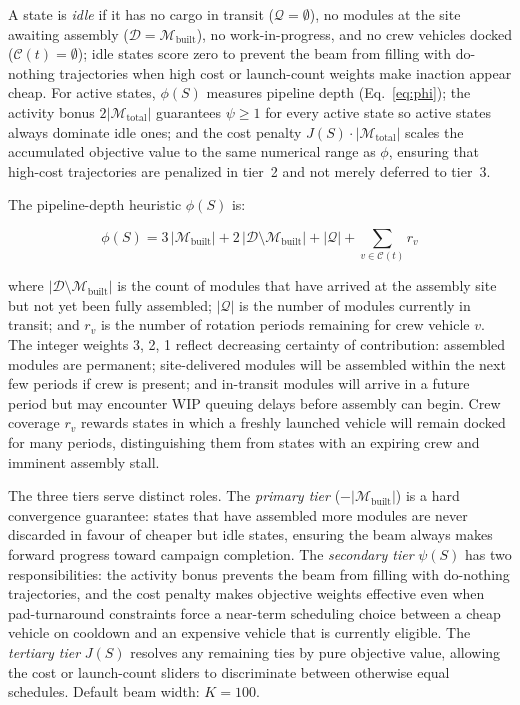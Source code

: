 \noindent A state is \emph{idle} if it has no cargo in transit
($\mathcal{Q} = \emptyset$), no modules at the site awaiting
assembly ($\mathcal{D} = \mathcal{M}_{\mathrm{built}}$), no
work-in-progress, and no crew vehicles docked
($\mathcal{C}(t) = \emptyset$); idle states score zero to prevent
the beam from filling with do-nothing trajectories when high cost
or launch-count weights make inaction appear cheap.
For active states, $\phi(S)$ measures pipeline depth
(Eq.~\ref{eq:phi}); the activity bonus
$2|\mathcal{M}_{\mathrm{total}}|$ guarantees $\psi \geq 1$ for
every active state so active states always dominate idle ones;
and the cost penalty $J(S) \cdot |\mathcal{M}_{\mathrm{total}}|$
scales the accumulated objective value to the same numerical range
as $\phi$, ensuring that high-cost trajectories are penalized in
tier~2 and not merely deferred to tier~3.

The pipeline-depth heuristic $\phi(S)$ is:

\begin{equation}
  \phi(S) = 3\,|\mathcal{M}_{\mathrm{built}}|
          + 2\,|\mathcal{D} \setminus \mathcal{M}_{\mathrm{built}}|
          + |\mathcal{Q}|
          + \sum_{v \in \mathcal{C}(t)} r_v
  \label{eq:phi}
\end{equation}

\noindent where $|\mathcal{D} \setminus \mathcal{M}_{\mathrm{built}}|$
is the count of modules that have arrived at the assembly site but
not yet been fully assembled; $|\mathcal{Q}|$ is the number of
modules currently in transit; and $r_v$ is the number of rotation
periods remaining for crew vehicle $v$.
The integer weights 3, 2, 1 reflect decreasing certainty of
contribution: assembled modules are permanent; site-delivered
modules will be assembled within the next few periods if crew is
present; and in-transit modules will arrive in a future period
but may encounter WIP queuing delays before assembly can begin.
Crew coverage $r_v$ rewards states in which a freshly launched
vehicle will remain docked for many periods, distinguishing them
from states with an expiring crew and imminent assembly stall.

The three tiers serve distinct roles.
The \emph{primary tier} ($-|\mathcal{M}_{\mathrm{built}}|$) is a
hard convergence guarantee: states that have assembled more modules
are never discarded in favour of cheaper but idle states,
ensuring the beam always makes forward progress toward campaign
completion.
The \emph{secondary tier} $\psi(S)$ has two responsibilities:
the activity bonus prevents the beam from filling with do-nothing
trajectories, and the cost penalty makes objective weights
effective even when pad-turnaround constraints force a near-term
scheduling choice between a cheap vehicle on cooldown and an
expensive vehicle that is currently eligible.
The \emph{tertiary tier} $J(S)$ resolves any remaining ties by
pure objective value, allowing the cost or launch-count sliders
to discriminate between otherwise equal schedules.
Default beam width: $K = 100$.

